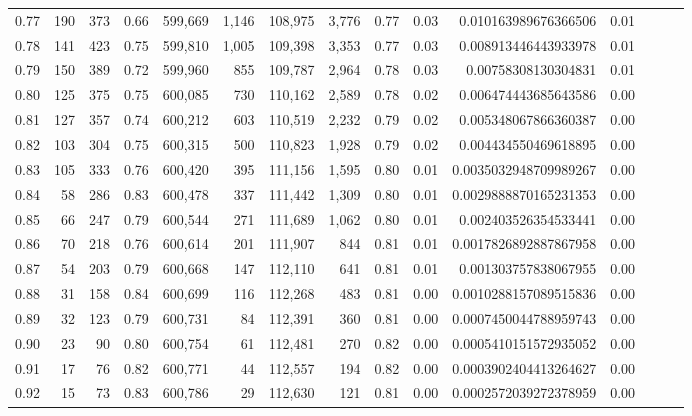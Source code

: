 \begin{tabular}{rrrrrrrrrrrrrrr}
0.77 &     190 &    373 &  0.66 &  599,669 &    1,146 &  108,975 &    3,776 &  0.77 &  0.03 &    0.010163989676366506 &      0.01 \\
0.78 &     141 &    423 &  0.75 &  599,810 &    1,005 &  109,398 &    3,353 &  0.77 &  0.03 &    0.008913446443933978 &      0.01 \\
0.79 &     150 &    389 &  0.72 &  599,960 &      855 &  109,787 &    2,964 &  0.78 &  0.03 &     0.00758308130304831 &      0.01 \\
0.80 &     125 &    375 &  0.75 &  600,085 &      730 &  110,162 &    2,589 &  0.78 &  0.02 &    0.006474443685643586 &      0.00 \\
0.81 &     127 &    357 &  0.74 &  600,212 &      603 &  110,519 &    2,232 &  0.79 &  0.02 &    0.005348067866360387 &      0.00 \\
0.82 &     103 &    304 &  0.75 &  600,315 &      500 &  110,823 &    1,928 &  0.79 &  0.02 &    0.004434550469618895 &      0.00 \\
0.83 &     105 &    333 &  0.76 &  600,420 &      395 &  111,156 &    1,595 &  0.80 &  0.01 &   0.0035032948709989267 &      0.00 \\
0.84 &      58 &    286 &  0.83 &  600,478 &      337 &  111,442 &    1,309 &  0.80 &  0.01 &   0.0029888870165231353 &      0.00 \\
0.85 &      66 &    247 &  0.79 &  600,544 &      271 &  111,689 &    1,062 &  0.80 &  0.01 &    0.002403526354533441 &      0.00 \\
0.86 &      70 &    218 &  0.76 &  600,614 &      201 &  111,907 &      844 &  0.81 &  0.01 &   0.0017826892887867958 &      0.00 \\
0.87 &      54 &    203 &  0.79 &  600,668 &      147 &  112,110 &      641 &  0.81 &  0.01 &    0.001303757838067955 &      0.00 \\
0.88 &      31 &    158 &  0.84 &  600,699 &      116 &  112,268 &      483 &  0.81 &  0.00 &   0.0010288157089515836 &      0.00 \\
0.89 &      32 &    123 &  0.79 &  600,731 &       84 &  112,391 &      360 &  0.81 &  0.00 &   0.0007450044788959743 &      0.00 \\
0.90 &      23 &     90 &  0.80 &  600,754 &       61 &  112,481 &      270 &  0.82 &  0.00 &   0.0005410151572935052 &      0.00 \\
0.91 &      17 &     76 &  0.82 &  600,771 &       44 &  112,557 &      194 &  0.82 &  0.00 &   0.0003902404413264627 &      0.00 \\
0.92 &      15 &     73 &  0.83 &  600,786 &       29 &  112,630 &      121 &  0.81 &  0.00 &   0.0002572039272378959 &      0.00 \\

\end{tabular}
